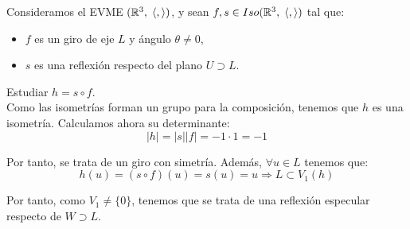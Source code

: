 \begin{ejercicio}
    Consideramos el EVME $(\mathbb{R}^3,\;\langle,\rangle)$, y sean $f,s\in Iso(\mathbb{R}^3, \;\langle,\rangle)$ tal que:
    \begin{itemize}
        \item $f$ es un giro de eje $L$ y ángulo $\theta \neq 0$,
        \item $s$ es una reflexión respecto del plano $U\supset L$.
    \end{itemize}

    Estudiar $h=s\circ f$.\\

    Como las isometrías forman un grupo para la composición, tenemos que $h$ es una isometría. Calculamos ahora su determinante:
    \begin{equation*}
        |h| = |s||f| = -1\cdot 1 = -1
    \end{equation*}

    Por tanto, se trata de un giro con simetría. Además, $\forall u\in L$ tenemos que:
    \begin{equation*}
        h(u) = (s\circ f)(u) = s(u) = u \Longrightarrow L\subset V_1(h)
    \end{equation*}

    Por tanto, como $V_1\neq \{0\}$, tenemos que se trata de una reflexión especular respecto de $W\supset L$.
\end{ejercicio}


